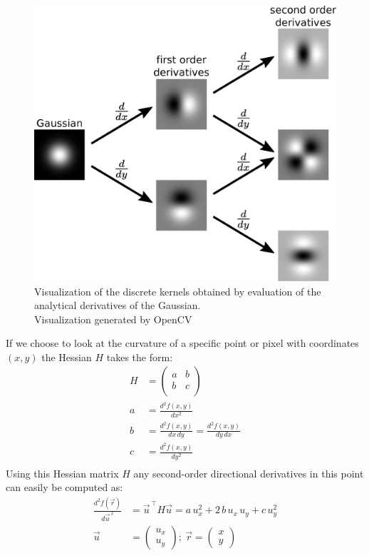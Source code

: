 \documentclass[12pt,english,twocolumn]{revtex4}
\begin{document}
\begin{figure}[h]
    \centering
    \includegraphics[width=.9\linewidth]{illustrations/gaussian_derivatives.eps}
    \caption{Visualization of the discrete kernels obtained by evaluation of the analytical derivatives of the Gaussian.\\
    		Visualization generated by OpenCV  \cite{opencv_library}}
    \label{fig:Hessian_kernels}
\end{figure}
If we choose to look at the curvature of a specific point or pixel with coordinates $(x,y)$ the Hessian $H$ takes the form:
\begin{align*}
    H &=
    \left(
    \begin{array}{rr}
        a & b \\
        b & c \\
    \end{array}
    \right)\\
    a &= \frac{d^{2}f(x,y)}{dx^{2}} \\
    b &= \frac{d^{2}f(x,y)}{dx \, dy} = \frac{d^{2}f(x,y)}{dy \, dx}\\
    c &= \frac{d^{2}f(x,y)}{dy^{2}}\\
\end{align*}
Using this Hessian matrix $H$ any second-order directional derivatives in this point can easily be computed as:
\begin{align*}
    \frac{d^2f(\Vec{r})}{d\Vec{u}^{\,2}} &=\Vec{u}^{\,\intercal} H \Vec{u} = a\,u_x^2 + 2\,b\,u_x\,u_y + c\,u_y^2 \\
    \Vec{u} &= \left(
    \begin{array}{c}
        u_x\\
        u_y
    \end{array}
    \right); \ \Vec{r} = \left(
    \begin{array}{c}
        x\\
        y
    \end{array} \right)
\end{align*}
\end{document}
